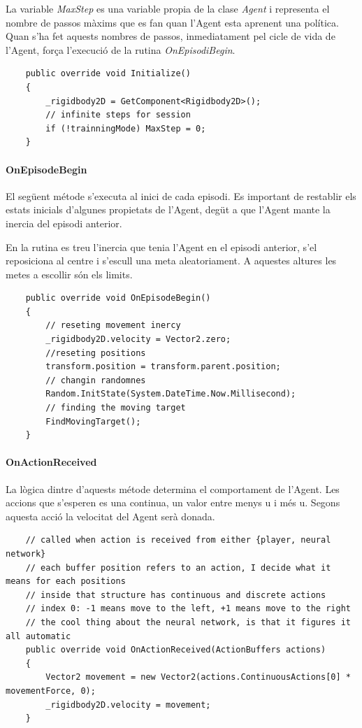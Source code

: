 \documentclass{article}
\begin{document}
    La variable \textit{MaxStep} es una variable propia de la clase \textit{Agent} i representa el nombre de passos màxims que es fan quan l'Agent esta aprenent una política. Quan s'ha fet aquests nombres de passos, inmediatament pel cicle de vida de l'Agent, força l'execució de la rutina \textit{OnEpisodiBegin}. \\
    
    \begin{lstlisting}
    public override void Initialize()
    {
        _rigidbody2D = GetComponent<Rigidbody2D>();
        // infinite steps for session
        if (!trainningMode) MaxStep = 0;
    }
    \end{lstlisting}
    
    
    \newpage
    
    \paragraph{OnEpisodeBegin}
    
    El següent métode s'executa al inici de cada episodi. Es important de restablir els estats inicials d'algunes propietats de l'Agent, degüt a que l'Agent mante la inercia del episodi anterior.
    
    En la rutina es treu l'inercia que tenia l'Agent en el episodi anterior, s'el reposiciona al centre i s'escull una meta aleatoriament. A aquestes altures les metes a escollir són els limits.
    
    \begin{lstlisting}
    public override void OnEpisodeBegin()
    {
        // reseting movement inercy
        _rigidbody2D.velocity = Vector2.zero;
        //reseting positions
        transform.position = transform.parent.position;
        // changin randomnes
        Random.InitState(System.DateTime.Now.Millisecond);
        // finding the moving target
        FindMovingTarget();
    }
    \end{lstlisting}
    
    \paragraph{OnActionReceived}
    
    La lògica dintre d'aquests métode determina el comportament de l'Agent.
    Les accions que s'esperen es una continua, un valor entre menys u i més u. Segons aquesta acció la velocitat del Agent serà donada.
    
    \begin{lstlisting}
    // called when action is received from either {player, neural network}
    // each buffer position refers to an action, I decide what it means for each positions
    // inside that structure has continuous and discrete actions
    // index 0: -1 means move to the left, +1 means move to the right
    // the cool thing about the neural network, is that it figures it all automatic
    public override void OnActionReceived(ActionBuffers actions)
    {
        Vector2 movement = new Vector2(actions.ContinuousActions[0] * movementForce, 0);
        _rigidbody2D.velocity = movement;
    }
    \end{lstlisting}
    
\end{document}
